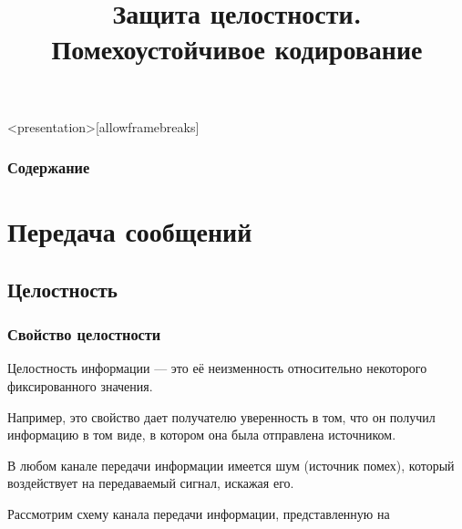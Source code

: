 
\title[Помехоустойчивое кодирование]{Защита целостности. Помехоустойчивое кодирование}






\begin{frame}<presentation>[allowframebreaks]
\frametitle{Содержание}
\tableofcontents
\end{frame}


\section{Передача сообщений}


\subsection{Целостность}


\begin{frame}
    \frametitle{Свойство целостности}
    
    \begin{definition}%
        \alert{Целостность} информации --- это её неизменность относительно некоторого фиксированного значения.
    \end{definition}
    Например, это свойство дает \alert{получателю} уверенность в том, что он получил информацию в том виде, 
    в котором она была отправлена \alert{источником}. 
    
    В любом канале передачи информации имеется \alert{шум} (источник \alert{помех}), который воздействует 
    на передаваемый \alert{сигнал}, искажая его. 
    
\end{frame}


Рассмотрим схему канала передачи информации, представленную на


